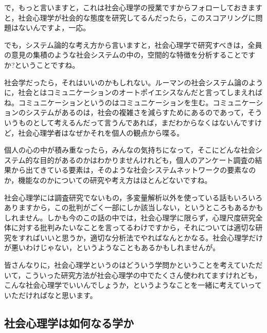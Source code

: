 \documentclass{ltjsbook}
\begin{document}
で，もっと言いますと，これは社会心理学の授業ですからフォローしておきますと，社会心理学が社会的な態度を研究してるんだったら，このスコアリングに問題はないんですよ，一応。

でも，システム論的な考え方から言いますと，社会心理学で研究すべきは，全員の意見の集積のような社会システムの中の，空間的な特徴を分析することですか?ということですね。

社会学だったら，それはいいのかもしれない。ルーマンの社会システム論のように，社会とはコミュニケーションのオートポイエシスなんだと言ってしまえればね。コミュニケーションというのはコミュニケーションを生む。コミュニケーションのシステムがあるのは，社会の複雑さを減らすためにあるのであって，そういうものとして考えるんだって言うんであれば，まだわからなくはないんですけど，社会心理学者はなぜかそれを個人の観点から喋る。

個人の心の中が積み重なったら，みんなの気持ちになって，そこにどんな社会システム的な目的があるのかはわかりませんけれども，個人のアンケート調査の結果から出てきている要素は，そのような社会システムネットワークの要素なのか，機能なのかについての研究や考え方はほとんどないですね。

社会心理学には調査研究でないもの，多変量解析以外を使っている話もいろいろありますから，この批判がごく一部にしか該当しない，というところもあるかもしれません。しかも今のこの話の中では，社会心理学に限らず，心理尺度研究全体に対する批判みたいなことを言ってるわけですから，それについては適切な研究をすればいいと思うか，適切な分析法でやればなんとかなる。社会心理学だけが悪いわけじゃない，というようなこともあるかもしれませんが。

皆さんなりに，社会心理学というのはどういう学問かということを考えていただいて，こういった研究方法が社会心理学の中でたくさん使われてますけれども，こんな社会心理学でいいんでしょうか，というようなことを一緒に考えていっていただければなと思います。

\subsection{社会心理学は如何なる学か}
\end{document}
